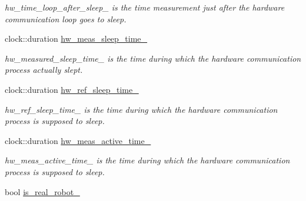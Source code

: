 \begin{DoxyCompactItemize}
\begin{DoxyCompactList}\small\item\em hw\+\_\+time\+\_\+loop\+\_\+after\+\_\+sleep\+\_\+ is the time measurement just after the hardware communication loop goes to sleep. \end{DoxyCompactList}\item 
clock\+::duration \hyperlink{classdynamic__graph_1_1DynamicGraphManager_afb2f9b39e5c529d525999c3e91e06213}{hw\+\_\+meas\+\_\+sleep\+\_\+time\+\_\+}\hypertarget{classdynamic__graph_1_1DynamicGraphManager_afb2f9b39e5c529d525999c3e91e06213}{}\label{classdynamic__graph_1_1DynamicGraphManager_afb2f9b39e5c529d525999c3e91e06213}

\begin{DoxyCompactList}\small\item\em hw\+\_\+measured\+\_\+sleep\+\_\+time\+\_\+ is the time during which the hardware communication process actually slept. \end{DoxyCompactList}\item 
clock\+::duration \hyperlink{classdynamic__graph_1_1DynamicGraphManager_aa89f848a27f201aed320e2c6a441dc02}{hw\+\_\+ref\+\_\+sleep\+\_\+time\+\_\+}\hypertarget{classdynamic__graph_1_1DynamicGraphManager_aa89f848a27f201aed320e2c6a441dc02}{}\label{classdynamic__graph_1_1DynamicGraphManager_aa89f848a27f201aed320e2c6a441dc02}

\begin{DoxyCompactList}\small\item\em hw\+\_\+ref\+\_\+sleep\+\_\+time\+\_\+ is the time during which the hardware communication process is supposed to sleep. \end{DoxyCompactList}\item 
clock\+::duration \hyperlink{classdynamic__graph_1_1DynamicGraphManager_af4c9ca6b9c161ac578b6726eaa7b7826}{hw\+\_\+meas\+\_\+active\+\_\+time\+\_\+}\hypertarget{classdynamic__graph_1_1DynamicGraphManager_af4c9ca6b9c161ac578b6726eaa7b7826}{}\label{classdynamic__graph_1_1DynamicGraphManager_af4c9ca6b9c161ac578b6726eaa7b7826}

\begin{DoxyCompactList}\small\item\em hw\+\_\+meas\+\_\+active\+\_\+time\+\_\+ is the time during which the hardware communication process is supposed to sleep. \end{DoxyCompactList}\item 
bool \hyperlink{classdynamic__graph_1_1DynamicGraphManager_a81617144faf55e4ed2bf60165060b0f5}{is\+\_\+real\+\_\+robot\+\_\+}\hypertarget{classdynamic__graph_1_1DynamicGraphManager_a81617144faf55e4ed2bf60165060b0f5}{}\label{classdynamic__graph_1_1DynamicGraphManager_a81617144faf55e4ed2bf60165060b0f5}


\end{DoxyCompactItemize}
